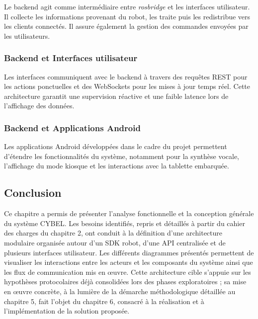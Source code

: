 Le backend agit comme intermédiaire entre \textit{rosbridge} et les
interfaces utilisateur. Il collecte les informations provenant du robot,
les traite puis les redistribue vers les clients connectés. Il assure
également la gestion des commandes envoyées par les utilisateurs.

\subsubsection{Backend et Interfaces utilisateur}

Les interfaces communiquent avec le backend à travers des requêtes REST
pour les actions ponctuelles et des WebSockets pour les mises à jour
temps réel. Cette architecture garantit une supervision réactive et une
faible latence lors de l'affichage des données.

\subsubsection{Backend et Applications Android}

Les applications Android développées dans le cadre du projet permettent
d'étendre les fonctionnalités du système, notamment pour la synthèse
vocale, l'affichage du mode kiosque et les interactions avec la tablette
embarquée.

\subsection{Conclusion}

Ce chapitre a permis de présenter l'analyse fonctionnelle et la conception
générale du système CYBEL. Les besoins identifiés, repris et détaillés à
partir du cahier des charges du chapitre 2, ont conduit à la définition
d'une architecture modulaire organisée autour d'un SDK robot, d'une API
centralisée et de plusieurs interfaces utilisateur. Les différents
diagrammes présentés permettent de visualiser les interactions entre les
acteurs et les composants du système ainsi que les flux de communication
mis en \oe uvre. Cette architecture cible s'appuie sur les hypothèses
protocolaires déjà consolidées lors des phases exploratoires ; sa mise en
œuvre concrète, à la lumière de la démarche méthodologique détaillée au
chapitre 5, fait l'objet du chapitre 6, consacré à la réalisation et à
l'implémentation de la solution proposée.